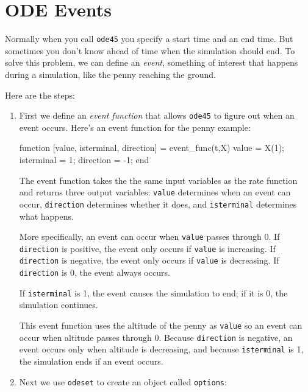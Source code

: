 \section{ODE Events}
\label{events}


Normally when you call {\tt ode45} you specify a start time and
an end time.  But sometimes you don't know ahead of time when the
simulation should end.  To solve this problem, we can define an \emph{event}, 
something of interest that happens during a simulation,
like the penny reaching the ground.

Here are the steps: 


\begin{enumerate}

\item First we define an \emph{event function} that allows {\tt ode45} to figure out when
an event occurs.  Here's an event function for the penny example:

\begin{code}
function [value, isterminal, direction] = event_func(t,X)
    value = X(1);
    isterminal = 1;
    direction = -1;
end
\end{code}

The event function takes the the same input variables as the rate function and returns three output variables: {\tt value} determines when an event can occur, {\tt direction} determines whether it does, and {\tt isterminal} determines what happens.

More specifically, an event can occur when {\tt value} passes through 0.
If {\tt direction} is positive, the event only occurs if {\tt value} is increasing.
If {\tt direction} is negative, the event only occurs if {\tt value} is decreasing.
If {\tt direction} is 0, the event always occurs.

If {\tt isterminal} is 1, the event causes the simulation to end; if it is 0, the simulation continues.

This event function uses the altitude of the penny as {\tt value} so an event can occur when altitude passes through 0.  
Because {\tt direction} is negative, an event occurs only when altitude is decreasing, and
because {\tt isterminal} is 1, the simulation ends if an event occurs.


\item Next we use {\tt odeset} to create an object called {\tt options}:


\end{enumerate}
